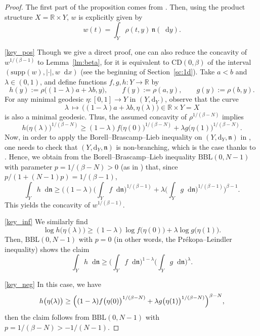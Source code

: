 \documentclass[sts]{imsart}
\theoremstyle{definition}
\theoremstyle{remark}
\newcommand{\R}{\mathbb{R}}
\newcommand{\fn}{\mathfrak{n}}
\newcommand{\dist}{\mathrm{d}}
\newcommand{\lra}{\longrightarrow}
\newcommand{\CD}{\mathrm{CD}}
\newcommand{\supp}{\mathrm{supp}}
\newcommand*\diff{\mathop{}\!\mathrm{d}}
\begin{document}
\begin{proof}
The first part of the proposition comes from \cite[Theorem~1.4]{gsplit}.
Then, using the product structure $X=\R \times Y$, $w$ is explicitly given by
\[ w(t) =\int_Y \rho(t,y) \,\fn(\diff y). \]

\eqref{key_pos}
Though we give a direct proof, one can also reduce the concavity of $w^{1/(\beta -1)}$ to Lemma~\ref{lm:beta}, for it is equivalent to $\CD(0,\beta)$ of the interval $(\supp(w),|\cdot|,w \diff x)$ (see the beginning of Section~\ref{sc:1d}).
Take $a<b$ and $\lambda \in (0,1)$, and define functions $f,g,h \colon Y \lra \R$ by
\[
h(y) := \rho\bigl( (1-\lambda)a +\lambda b,y \bigr), \qquad
f(y) := \rho(a,y), \qquad
g(y) := \rho(b,y).
\]
For any minimal geodesic $\eta\colon [0,1] \lra Y$ in $(Y,\dist_Y)$, observe that the curve
\[
\lambda \,\longmapsto\, \bigl( (1-\lambda)a +\lambda b,\eta(\lambda) \bigr) \in \R \times Y =X
\]
is also a minimal geodesic.
Thus, the assumed concavity of $\rho^{1/(\beta-N)}$ implies
\[
 h\bigl( \eta(\lambda) \bigr)^{1/(\beta-N)} \ge (1-\lambda) f\bigl( \eta(0) \bigr)^{1/(\beta-N)} +\lambda g\bigl( \eta(1) \bigr)^{1/(\beta-N)}.
\]
Now, in order to apply the Borell--Brascamp--Lieb inequality on $(Y,\dist_Y,\fn)$ in \cite[Theorem 3.1]{bacher2010borell}, one needs to check that $(Y,\dist_Y,\fn)$ is non-branching, which is the case thanks to \cite{deng2020}.
Hence, we obtain from the Borell--Brascamp--Lieb inequality $\mathrm{BBL}(0,N-1)$ with parameter $p=1/(\beta -N)>0$ (as in \cite[Definition~1.1]{bacher2010borell}) that, since $p/(1+(N-1)p)=1/(\beta -1)$,
\[
\int_Y h \diff\fn
    \ge \Biggl( (1-\lambda) \biggl( \int_Y f \diff\fn \biggr)^{1/(\beta -1)} +\lambda \biggl( \int_Y g \diff\fn \biggr)^{1/(\beta -1)} \Biggr)^{\beta -1}.
\]
This yields the concavity of $w^{1/(\beta -1)}$.

\eqref{key_inf}
We similarly find
\[
 \log h\bigl( \eta(\lambda) \bigr) \ge (1-\lambda) \log f\bigl( \eta(0) \bigr) +\lambda \log g\bigl( \eta(1) \bigr).
\]
Then, $\mathrm{BBL}(0,N-1)$ with $p=0$ (in other words, the Pr\'ekopa--Leindler inequality) shows the claim
\[
\int_Y h \diff\fn \ge \biggl( \int_Y f \diff\fn \biggr)^{1-\lambda} \biggl( \int_Y g \diff\fn \biggr)^\lambda.
\]

\eqref{key_neg}
In this case, we have
\[
 h\bigl( \eta(\lambda) \bigr) \ge \Bigl( (1-\lambda) f\bigl( \eta(0) \bigr)^{1/(\beta-N)} +\lambda g\bigl( \eta(1) \bigr)^{1/(\beta-N)} \Bigr)^{\beta -N},
\]
then the claim follows from $\mathrm{BBL}(0,N-1)$ with $p=1/(\beta -N) >-1/(N-1)$.
\end{proof}
\end{document}
